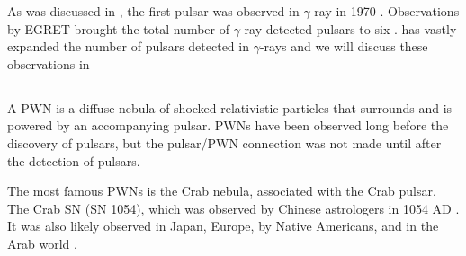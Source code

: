 As was discussed in ,
the first pulsar was observed in $\gamma$-ray in 1970
\citep{kniffen_1970_study-gamma}.  Observations by \ac{EGRET}
brought the total number of $\gamma$-ray-detected pulsars to six
\citep{nolan_1996a_egret-observations}.  \fermi has vastly expanded the
number of pulsars detected in $\gamma$-rays and we will discuss these
observations in \subsecref{2pc}

\subsection{}

A \gls{PWN} is a diffuse nebula of shocked relativistic particles
that surrounds and is powered by an accompanying pulsar. 
\glspl{PWN} have been observed long before the discovery of pulsars, but
the pulsar/\gls{PWN} connection was not made until
after the detection of pulsars.

The most famous \glspl{PWN} is the Crab nebula, associated with the Crab
pulsar.  The Crab \ac{SN} (SN 1054), which was observed by Chinese astrologers 
in 1054 AD \cite{hester_2008_nebula:-astrophysical}.
It was also likely observed in
Japan, Europe, by Native Americans,
and in the Arab world 
\citep[see][and references therein]{collins_1999a_reinterpretation-historical}.

